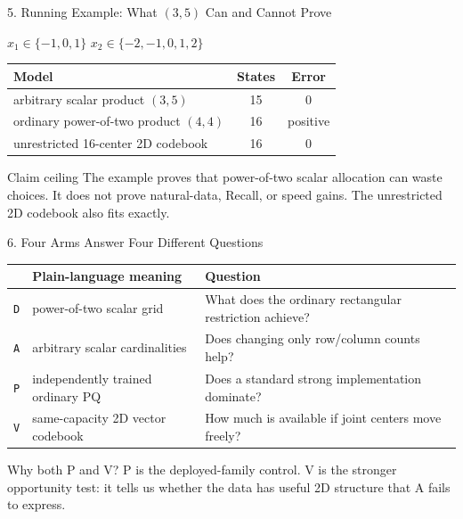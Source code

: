 \documentclass[aspectratio=169]{beamer}
\begin{document}
\begin{frame}{5. Running Example: What $(3,5)$ Can and Cannot Prove}
\begin{center}
$x_1\in\{-1,0,1\}$ \hspace{10mm} $x_2\in\{-2,-1,0,1,2\}$
\end{center}
\begin{tabularx}{\textwidth}{>{\raggedright\arraybackslash}X c c}
\toprule Model & States & Error\\
\midrule arbitrary scalar product $(3,5)$ & 15 & $0$\\
ordinary power-of-two product $(4,4)$ & 16 & positive\\
unrestricted 16-center 2D codebook & 16 & $0$\\
\bottomrule
\end{tabularx}
\begin{block}{Claim ceiling}
The example proves that power-of-two scalar allocation can waste choices. It does not prove natural-data, Recall, or speed gains. The unrestricted 2D codebook also fits exactly.
\end{block}
\end{frame}

\begin{frame}{6. Four Arms Answer Four Different Questions}
\small
\begin{tabularx}{\textwidth}{c >{\raggedright\arraybackslash}p{} X}
\toprule & Plain-language meaning & Question\\
\midrule
\texttt{D} & power-of-two scalar grid & What does the ordinary rectangular restriction achieve?\\
\texttt{A} & arbitrary scalar cardinalities & Does changing only row/column counts help?\\
\texttt{P} & independently trained ordinary PQ & Does a standard strong implementation dominate?\\
\texttt{V} & same-capacity 2D vector codebook & How much is available if joint centers move freely?\\
\bottomrule
\end{tabularx}
\normalsize
\begin{block}{Why both P and V?}
P is the deployed-family control. V is the stronger opportunity test: it tells us whether the data has useful 2D structure that A fails to express.
\end{block}
\end{frame}
\end{document}
